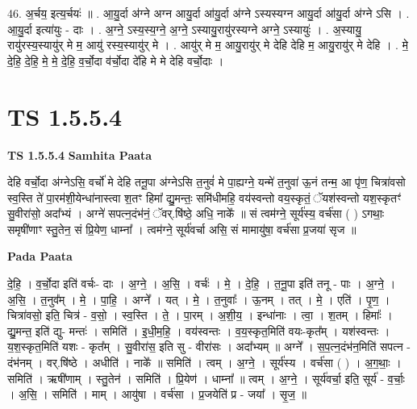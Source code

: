 \documentclass[17pt]{extarticle}
\begin{document}
46. अ॒र्चय॒ इत्य॒र्चयः॑ ॥ . आ॒यु॒र्दा अ॑ग्ने अग्न आयु॒र्दा आ॑यु॒र्दा अ॑ग्ने ऽस्यस्यग्न आयु॒र्दा आ॑यु॒र्दा अ॑ग्ने ऽसि । . आ॒यु॒र्दा इत्या॑युः - दाः । . अ॒ग्ने॒ ऽस्य॒स्य॒ग्ने॒ अ॒ग्ने॒ ऽस्यायु॒रायु॑रस्यग्ने अग्ने॒ ऽस्यायुः॑ । . अ॒स्यायु॒ रायु॑रस्य॒स्यायु॑र् मे म॒ आयु॑ रस्य॒स्यायु॑र् मे । . आयु॑र् मे म॒ आयु॒रायु॑र् मे देहि देहि म॒ आयु॒रायु॑र् मे देहि । . मे॒ दे॒हि॒ दे॒हि॒ मे॒ मे॒ दे॒हि॒ व॒र्चो॒दा व॑र्चो॒दा दे॑हि मे मे देहि वर्चो॒दाः । \newline
\pagebreak
{}
\section*{ TS 1.5.5.4 }

\textbf{TS 1.5.5.4 } \newline
\textbf{Samhita Paata} \newline

देहि वर्चो॒दा अ॑ग्नेऽसि॒ वर्चो॑ मे देहि तनू॒पा अ॑ग्नेऽसि त॒नुवं॑ मे पा॒ह्यग्ने॒ यन्मे॑ त॒नुवा॑ ऊ॒नं तन्म॒ आ पृ॑ण॒ चित्रा॑वसो स्व॒स्ति ते॑ पा॒रम॑शी॒येन्धा॑नास्त्वा श॒तꣳ हिमा᳚ द्यु॒मन्तः॒ समि॑धीमहि॒ वय॑स्वन्तो वय॒स्कृतं॒ ॅयश॑स्वन्तो यश॒स्कृतꣳ॑ सु॒वीरा॑सो॒ अदा᳚भ्यं । अग्ने॑ सपत्न॒दंभ॑नं॒ ॅवर्.षि॑ष्ठे॒ अधि॒ नाके᳚ ॥ सं त्वम॑ग्ने॒ सूर्य॑स्य॒ वर्च॑सा ( ) ऽगथाः॒ समृषी॑णाꣳ स्तु॒तेन॒ सं प्रि॒येण॒ धाम्ना᳚ । त्वम॑ग्ने॒ सूर्य॑वर्चा असि॒ सं मामायु॑षा॒ वर्च॑सा प्र॒जया॑ सृज ॥ \newline

\textbf{Pada Paata} \newline

दे॒हि॒ । व॒र्चो॒दा इति॑ वर्चः- दाः । अ॒ग्ने॒ । अ॒सि॒ । वर्चः॑ । मे॒ । दे॒हि॒ । त॒नू॒पा इति॑ तनू - पाः । अ॒ग्ने॒ । अ॒सि॒ । त॒नुव᳚म् । मे॒ । पा॒हि॒ । अग्ने᳚ । यत् । मे॒ । त॒नुवाः᳚ । ऊ॒नम् । तत् । मे॒ । एति॑ । पृ॒ण॒ । चित्रा॑वसो॒ इति॒ चित्र॑ - व॒सो॒ । स्व॒स्ति । ते॒ । पा॒रम् । अ॒शी॒य॒ । इन्धा॑नाः । त्वा॒ । श॒तम् । हिमाः᳚ । द्यु॒मन्त॒ इति॑ द्यु- मन्तः॑ । समिति॑ । इ॒धी॒म॒हि॒ । वय॑स्वन्तः । व॒य॒स्कृत॒मिति॑ वयः-कृत᳚म् । यश॑स्वन्तः । य॒श॒स्कृत॒मिति॑ यशः - कृत᳚म् । सु॒वीरा॑स॒ इति सु - वीरा॑सः । अदा᳚भ्यम् ॥ अग्ने᳚ । स॒प॒त्न॒दंभ॑न॒मिति॑ सपत्न - दंभ॑नम् । वर्.षि॑ष्ठे । अधीति॑ । नाके᳚ ॥ समिति॑ । त्वम् । अ॒ग्ने॒ । सूर्य॑स्य । वर्च॑सा ( ) । अ॒ग॒थाः॒ । समिति॑ । ऋषी॑णाम् । स्तु॒तेन॑ । समिति॑ । प्रि॒येण॑ । धाम्ना᳚ ॥ त्वम् । अ॒ग्ने॒ । सूर्य॑वर्चा॒ इति॒ सूर्य॑ - व॒र्चाः॒ । अ॒सि॒ । समिति॑ । माम् । आयु॑षा । वर्च॑सा । प्र॒जयेति॑ प्र - जया᳚ । सृ॒ज॒ ॥  \newline
\end{document}
